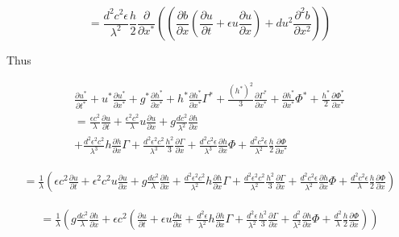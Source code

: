 \documentclass[12pt]{article}
\begin{document}
\[ = \frac{d^2c^2\epsilon}{\lambda^2}\frac{h}{2}\frac{\partial}{\partial x^*}\left(\left( \frac{\partial b}{\partial x}\left( \frac{\partial u}{\partial t } + \epsilon u\frac{\partial u}{\partial x}\right) + d u^2\frac{\partial^2 b}{\partial x^2} \right)\right)\]


Thus




\begin{equation}
\begin{split}
\frac{\partial u^*}{\partial t^*} + u^*\frac{\partial u^*}{\partial x^*} + g^*\frac{\partial h^*}{\partial x^*} + h^*\frac{\partial h^*}{\partial x^*}\Gamma^*+ \frac{\left(h^*\right)^2}{3}\frac{\partial \Gamma^*}{\partial x^*} + \frac{\partial h^*}{\partial x^*}\Phi^*+ \frac{h^*}{2}\frac{\partial \Phi^*}{\partial x^*} \\
=\frac{\epsilon c^2}{\lambda} \frac{\partial u}{\partial t } +\frac{\epsilon^2c^2}{\lambda} u \frac{\partial u}{\partial x} + g \frac{dc^2}{\lambda^2}\frac{\partial h}{\partial x} \\ + \frac{d^2\epsilon^2 c^2}{\lambda^3} h\frac{\partial h}{\partial x} \Gamma  + \frac{d^2 \epsilon^2 c^2}{\lambda^3} \frac{h^2}{3}\frac{\partial \Gamma}{\partial x}+ \frac{d^2c^2 \epsilon}{\lambda^3} \frac{\partial h}{\partial x}\Phi + \frac{d^2c^2\epsilon}{\lambda^2}\frac{h}{2}\frac{\partial \Phi}{\partial x^*}
\end{split}
\end{equation}

\begin{equation}
\begin{split}
=\frac{1}{\lambda}\left(\epsilon c^2 \frac{\partial u}{\partial t } + \epsilon^2c^2 u \frac{\partial u}{\partial x} + g \frac{dc^2}{\lambda}\frac{\partial h}{\partial x} + \frac{d^2\epsilon^2 c^2}{\lambda^2} h\frac{\partial h}{\partial x} \Gamma  + \frac{d^2 \epsilon^2 c^2}{\lambda^2} \frac{h^2}{3}\frac{\partial \Gamma}{\partial x}+ \frac{d^2c^2 \epsilon}{\lambda^2} \frac{\partial h}{\partial x}\Phi + \frac{d^2c^2\epsilon}{\lambda}\frac{h}{2}\frac{\partial \Phi}{\partial x} \right)
\end{split}
\end{equation}

\begin{equation}
\begin{split}
=\frac{1}{\lambda}\left(g \frac{dc^2}{\lambda}\frac{\partial h}{\partial x} + \epsilon c^2\left( \frac{\partial u}{\partial t } + \epsilon u \frac{\partial u}{\partial x} + \frac{d^2\epsilon}{\lambda^2} h\frac{\partial h}{\partial x} \Gamma  + \frac{d^2 \epsilon}{\lambda^2} \frac{h^2}{3}\frac{\partial \Gamma}{\partial x}+ \frac{d^2}{\lambda^2} \frac{\partial h}{\partial x}\Phi + \frac{d^2}{\lambda}\frac{h}{2}\frac{\partial \Phi}{\partial x} \right)\right)
\end{split}
\end{equation}
\end{document}
